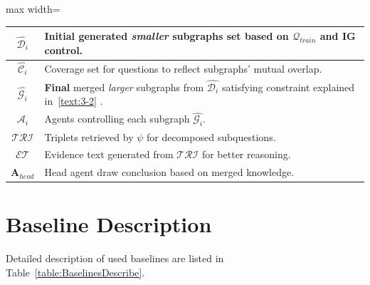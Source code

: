 \documentclass[sigconf]{acmart}
\begin{document}
\begin{table}[h]
\begin{adjustbox}{max width=\textwidth}
\begin{tabular}{c|l}
      $\hat{\mathcal{D}_i}$ & \textbf{Initial} generated \textit{smaller} subgraphs set based on $\mathcal{Q}_{train}$ and $\mathbf{IG}$ control.\\ \midrule
      $\hat{\mathcal{C}_i}$ & Coverage set for questions to reflect subgraphs' mutual overlap.\\ \midrule
      $\hat{\mathcal{G}_i}$ & \textbf{Final} merged \textit{larger} subgraphs from $\hat{\mathcal{D}_i}$ satisfying constraint explained in~\ref{text:3-2} .\\ \midrule
      $\mathcal{A}_i$ & Agents controlling each subgraph $\hat{\mathcal{G}_i}$. \\ \midrule
      $\mathcal{TRI}$ & Triplets retrieved by $\psi$ for decomposed subquestions.\\ \midrule
      $\mathcal{ET}$ & Evidence text generated from $\mathcal{TRI}$ for better reasoning.\\ \midrule
       $\mathbf{A}_{head}$ & Head agent draw conclusion based on merged knowledge. \\ \midrule
       \bottomrule
    \end{tabular}
  \end{adjustbox}
  \label{table:notation}
\end{table}


\section{Baseline Description} \label{app:baseline}

Detailed description of used baselines are listed in Table~\ref{table:BaselinesDescribe}.
\end{document}
